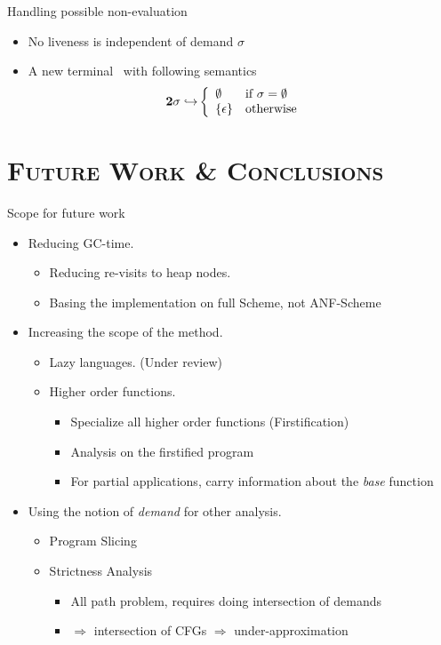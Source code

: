 \documentclass[xcolor=x11names,compress,mathserif]{beamer}
\renewcommand{\(}{\begin{columns}}
\renewcommand{\)}{\end{columns}}
\newcommand{\<}[1]{\begin{column}{#1}}
\renewcommand{\>}{\end{column}}
\begin{document}
\begin{frame} {Handling possible non-evaluation}
  \begin{itemize}
  \item No liveness is independent of demand $\sigma$
  \item A new terminal \clazy\ with following semantics
    \begin{align*}
      {\mathbf{2}}\sigma \hookrightarrow & \left\{ 
      \begin{array}{ll}
        \emptyset&\mbox{if}~\sigma = \emptyset\\
        \{\epsilon\} & \mbox{otherwise}
      \end{array}\right.
    \end{align*}
  \end{itemize}
\end{frame}
\section{\scshape Future Work  \& Conclusions} 
\begin{frame}{Scope for future work}
\normalsize
\begin{itemize}\itemsep2em
\item<1-> Reducing GC-time.
  \begin{itemize}
  \item Reducing re-visits to heap nodes.
  \item Basing the implementation on full Scheme, not ANF-Scheme
  \end{itemize}
\item<2-> Increasing the scope of the method.
  \begin{itemize}
  \item Lazy languages. (Under review)
  \item Higher order functions.
    \begin{itemize}
    \item Specialize all higher order functions (Firstification)
    \item Analysis on the firstified program 
    \item For partial applications, carry information about the {\em base} function
\end{itemize}
  \end{itemize}
\item<3-> Using the notion of {\em demand} for other analysis.
  \begin{itemize}
  \item Program Slicing
  \item Strictness Analysis
    \begin{itemize}
    \item All path problem, requires doing intersection of demands 
    \item $\Rightarrow$ intersection of CFGs $\Rightarrow$ under-approximation
    \end{itemize}
  \end{itemize}
\end{itemize}
\end{frame}
\end{document}
